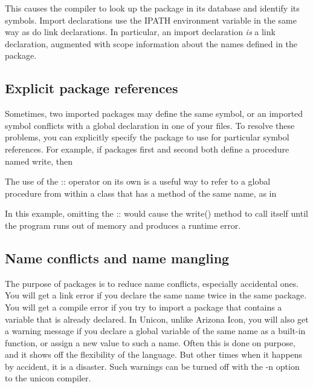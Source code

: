 
This causes the compiler to look up the package in its database and
identify its symbols.  Import declarations use the IPATH
environment variable in the same
way as do link declarations. In particular, an import declaration
\textit{is} a link declaration, augmented with scope
information about the names defined in the package.

\subsection*{Explicit package references}

Sometimes, two imported packages may define the same symbol, or an imported
symbol conflicts with a global declaration in one of your files. To resolve
these problems, you can explicitly specify the package to use for particular
symbol references. For example, if packages first and second both define a
procedure named write, then


The use of the \textsf{::} operator on its own is a useful way to refer
to a global procedure from within a class that has a method of the same
name, as in


In this example, omitting the \textsf{::} would cause the
\textsf{write()} method to call itself until the program runs out of
memory and produces a runtime error.

\subsection*{Name conflicts and name mangling}

The purpose of packages is to reduce name conflicts, especially accidental
ones. You will get a link error if you declare the same name twice in the same
package. You will get a compile error if you try to import a
package that contains a variable that is already declared. In Unicon, unlike
Arizona Icon, you will also get a warning message if you declare a global
variable of the same name as a built-in function, or assign a new value to such
a name. Often this is done on purpose, and it shows off the flexibility of the
language. But other times when it happens by accident, it is a disaster. Such
warnings can be turned off with the \textsf{{}-n} option to the \textsf{unicon}
compiler.

